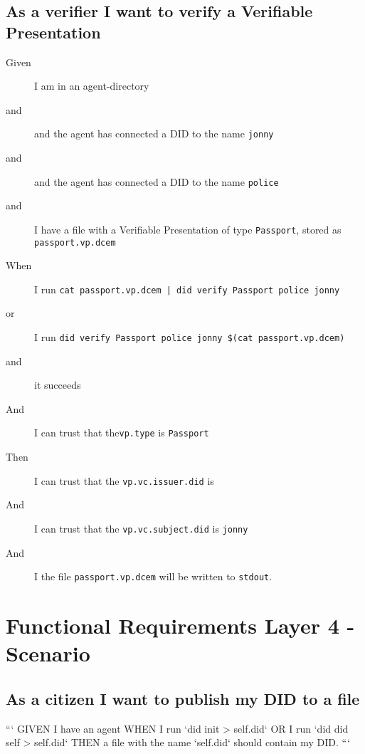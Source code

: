 \subsection{As a verifier I want to verify a Verifiable Presentation}
\begin{description}\begin{description}
    \item[Given] I am in an agent-directory
    \item[and] and the agent has connected a DID to the name \texttt{jonny}
    \item[and] and the agent has connected a DID to the name \texttt{police}
    \item[and] I have a file with a Verifiable Presentation of type \texttt{Passport}, stored as \texttt{passport.vp.dcem}
    \item[When] I run \texttt{cat passport.vp.dcem | did verify Passport police jonny}
    \item[or] I run \texttt{did verify Passport police jonny \$(cat passport.vp.dcem)}
    \item[and] it succeeds
    \item[And] I can trust that the\texttt{vp.type} is \texttt{Passport}
    \item[Then] I can trust that the \texttt{vp.vc.issuer.did} is 
    \item[And] I can trust that the \texttt{vp.vc.subject.did} is \texttt{jonny}
    \item[And] I the file \texttt{passport.vp.dcem} will be written to \texttt{stdout}.
\end{description}\end{description}



\newpage



\section{Functional Requirements Layer 4 - Scenario}

\subsection{As a citizen I want to publish my DID to a file}

```
GIVEN I have an agent
WHEN  I run `did init > self.did`
OR    I run `did did self > self.did`
THEN  a file with the name `self.did` should contain my DID.
```

